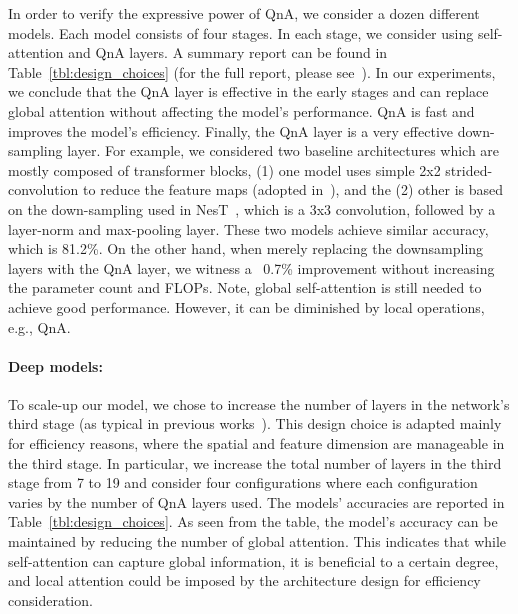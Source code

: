 In order to verify the expressive power of QnA, we consider a dozen different models. Each model consists of four stages. In each stage, we consider using self-attention and QnA layers. A summary report can be found in Table~\ref{tbl:design_choices} (for the full report, please see~). In our experiments, we conclude that the QnA layer is effective in the early stages and can replace global attention without affecting the model's performance. QnA is fast and improves the model's efficiency. Finally, the QnA layer is a very effective down-sampling layer. For example, we considered two baseline architectures which are mostly composed of transformer blocks, (1) one model uses simple 2x2 strided-convolution to reduce the feature maps (adopted in~\cite{Swin}), and the (2) other is based on the down-sampling used in NesT~\cite{NestT}, which is a 3x3 convolution, followed by a layer-norm and max-pooling layer. These two models achieve similar accuracy, which is 81.2\%. On the other hand, when merely replacing the downsampling layers with the QnA layer, we witness a ~0.7\% improvement without increasing the parameter count and FLOPs. Note, global self-attention is still needed to achieve good performance. However, it can be diminished by local operations, e.g., QnA.

\paragraph{Deep models:} 
To scale-up our model, we chose to increase the number of layers in the network's third stage (as typical in previous works~\cite{ResNet}). This design choice is adapted mainly for efficiency reasons, where the spatial and feature dimension are manageable in the third stage. In particular, we increase the total number of layers in the third stage from 7 to 19 and consider four configurations where each configuration varies by the number of QnA layers used. The models' accuracies are reported in Table~\ref{tbl:design_choices}. As seen from the table, the model's accuracy can be maintained by reducing the number of global attention. This indicates that while self-attention can capture global information, it is beneficial to a certain degree, and local attention could be imposed by the architecture design for efficiency consideration. 

